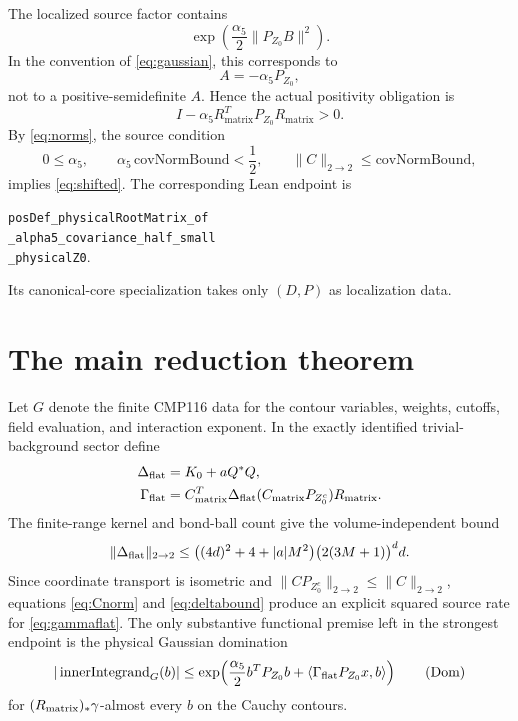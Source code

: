 \documentclass[11pt,a4paper]{article}
\theoremstyle{definition}
\newcommand{\opnorm}[1]{\lVert #1\rVert_{2\to2}}
\newcommand{\gauss}{\gamma}
\begin{document}
The localized source factor contains
\[
 \exp\!\left(\frac{\alpha_5}{2}\lVert P_{Z_0}B\rVert^2\right).
\]
In the convention of \eqref{eq:gaussian}, this corresponds to
\begin{equation}\label{eq:sign}
 A=-\alpha_5P_{Z_0},
\end{equation}
not to a positive-semidefinite $A$.  Hence the actual positivity obligation is
\begin{equation}\label{eq:shifted}
 I-\alpha_5R_{\mathrm{matrix}}^TP_{Z_0}R_{\mathrm{matrix}}>0.
\end{equation}
By \eqref{eq:norms}, the source condition
\begin{equation}\label{eq:small}
 0\le\alpha_5,
 \qquad \alpha_5\,\mathrm{covNormBound}<\frac12,
 \qquad \opnorm C\le\mathrm{covNormBound},
\end{equation}
implies \eqref{eq:shifted}.  The corresponding Lean endpoint is
\begin{center}\small
\texttt{posDef\_physicalRootMatrix\_of}\\
\texttt{\_alpha5\_covariance\_half\_small}\\
\texttt{\_physicalZ0}.
\end{center}
Its canonical-core specialization takes only $(D,P)$ as localization data.

\section{The main reduction theorem}

Let $G$ denote the finite CMP116 data for the contour variables, weights,
cutoffs, field evaluation, and interaction exponent.  In the exactly
identified trivial-background sector define
\begin{align}
 \Delta_{\rm flat}&=K_0+aQ^*Q,\label{eq:flatdelta}\\
 \Gamma_{\rm flat}
 &=C_{\rm matrix}^T\Delta_{\rm flat}
   (C_{\rm matrix}P_{Z_0^c})R_{\rm matrix}.\label{eq:gammaflat}
\end{align}
The finite-range kernel and bond-ball count give the volume-independent bound
\begin{equation}\label{eq:deltabound}
 \opnorm{\Delta_{\rm flat}}
 \le \bigl((4d)^2+4+|a|M^2\bigr)
       \bigl(2(3M+1)\bigr)^d d.
\end{equation}
Since coordinate transport is isometric and
$\opnorm{CP_{Z_0^c}}\le\opnorm C$, equations
\eqref{eq:Cnorm} and \eqref{eq:deltabound} produce an explicit squared source
rate for \eqref{eq:gammaflat}.  The only substantive functional premise left
in the strongest endpoint is the physical Gaussian domination
\begin{equation}\label{eq:hdom}
 |\operatorname{innerIntegrand}_{G}(b)|
 \le
 \exp\!\left(
  \frac{\alpha_5}{2}b^TP_{Z_0}b
  +\langle \Gamma_{\rm flat}P_{Z_0}x,b\rangle
 \right)\qquad\text{(Dom)}
\end{equation}
for $(R_{\rm matrix})_*\gauss$-almost every $b$ on the Cauchy contours.
\end{document}
